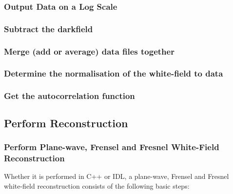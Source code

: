 \documentclass[]{cxs-software}
\begin{document}
\subsubsection{Output Data on a Log Scale}

\subsubsection{Subtract the darkfield}

\subsubsection{Merge (add or average) data files together}

\subsubsection{Determine the normalisation of the white-field to data}

\subsubsection{Get the autocorrelation function}


\subsection{Perform Reconstruction}

\subsubsection{Perform Plane-wave, Frensel and Fresnel White-Field Reconstruction}
\label{subsubsec:rec}

Whether it is performed in C++ or IDL, a plane-wave, Frensel and
Fresnel white-field reconstruction consists of the following basic
steps:
\end{document}
